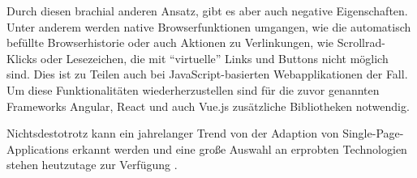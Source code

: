 Durch diesen brachial anderen Ansatz, gibt es aber auch negative Eigenschaften. Unter anderem werden native Browserfunktionen umgangen, wie die automatisch befüllte Browserhistorie oder auch Aktionen zu Verlinkungen, wie Scrollrad-Klicks oder Lesezeichen, die mit \enquote{virtuelle} Links und Buttons nicht möglich sind. Dies ist zu Teilen auch bei JavaScript-basierten Webapplikationen der Fall. Um diese Funktionalitäten wiederherzustellen sind für die zuvor genannten Frameworks Angular, React und auch Vue.js zusätzliche Bibliotheken notwendig.

Nichtsdestotrotz kann ein jahrelanger Trend von der Adaption von Single-Page-Applications erkannt werden und eine große Auswahl an erprobten Technologien stehen heutzutage zur Verfügung \cite{TheStateOfJavaScript2020}.

